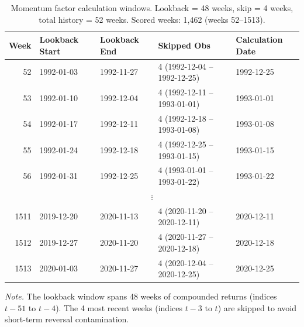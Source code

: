 \begin{table}[htbp]
\centering
\caption{Momentum factor calculation windows. Lookback = 48 weeks, skip = 4 weeks, total history = 52 weeks. Scored weeks: 1,462 (weeks 52--1513).}
\label{tab:momentum_calc}
\small
\begin{tabular}{r l l l l}
\toprule
    Week & Lookback Start & Lookback End & Skipped Obs & Calculation Date \\
\midrule
    52 & 1992-01-03 & 1992-11-27 & 4 (1992-12-04 -- 1992-12-25) & 1992-12-25 \\
    53 & 1992-01-10 & 1992-12-04 & 4 (1992-12-11 -- 1993-01-01) & 1993-01-01 \\
    54 & 1992-01-17 & 1992-12-11 & 4 (1992-12-18 -- 1993-01-08) & 1993-01-08 \\
    55 & 1992-01-24 & 1992-12-18 & 4 (1992-12-25 -- 1993-01-15) & 1993-01-15 \\
    56 & 1992-01-31 & 1992-12-25 & 4 (1993-01-01 -- 1993-01-22) & 1993-01-22 \\
    \multicolumn{5}{c}{$\vdots$} \\
    1511 & 2019-12-20 & 2020-11-13 & 4 (2020-11-20 -- 2020-12-11) & 2020-12-11 \\
    1512 & 2019-12-27 & 2020-11-20 & 4 (2020-11-27 -- 2020-12-18) & 2020-12-18 \\
    1513 & 2020-01-03 & 2020-11-27 & 4 (2020-12-04 -- 2020-12-25) & 2020-12-25 \\
\bottomrule
\end{tabular}
\vspace{4pt}
\begin{flushleft}
\footnotesize
\textit{Note.} The lookback window spans 48 weeks of compounded returns (indices $t-51$ to $t-4$). The 4 most recent weeks (indices $t-3$ to $t$) are skipped to avoid short-term reversal contamination.
\end{flushleft}
\end{table}
